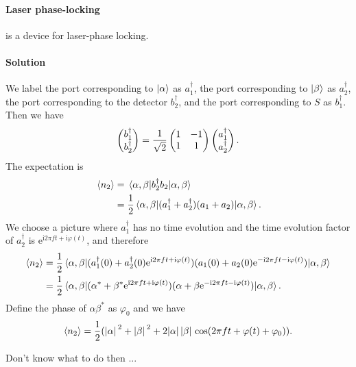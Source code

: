 \documentclass[hyperref, a4paper]{article}
\newcommand*{\ii}{\mathrm{i}}
\newcommand*{\ee}{\mathrm{e}}
\begin{document}
\paragraph{Laser phase-locking}  is a device for laser-phase locking. 


\paragraph{Solution} We label the port corresponding to $\ket{\alpha}$ as $a^\dagger_1$, the port corresponding to $\ket{\beta}$ as $a^\dagger_2$, the port corresponding to the detector $b^\dagger_2$, and the port corresponding to $S$ as $b^\dagger_1$.
Then we have 
\[
    \pmqty{b^\dagger_1 \\ b^\dagger_2} = \frac{1}{\sqrt{2}} \pmqty{1 & -1 \\ 1 & 1} \pmqty{ a^\dagger_1 \\ a^\dagger_2 }.
\]
The expectation is 
\[
    \begin{aligned}
        \expval*{n_2} &= \mel*{\alpha, \beta}{b_2^\dagger b_2}{\alpha, \beta} \\
        &= \frac{1}{2} \mel*{\alpha, \beta}{ (a_1^\dagger + a_2^\dagger) (a_1 + a_2) }{\alpha, \beta} .
    \end{aligned}
\]
We choose a picture where $a_1^\dagger$ has no time evolution and the time evolution factor of $a_2^\dagger$ is $\ee^{\ii 2 \pi f t + \ii \varphi(t)}$, and therefore
\[
    \begin{aligned}
        \expval{n_2} &= \frac{1}{2} \mel*{\alpha, \beta}{ (a_1^\dagger(0) + a_2^\dagger(0) \ee^{\ii 2 \pi f t + \ii \varphi(t)}) (a_1(0) + a_2(0) \ee^{- \ii 2 \pi f t - \ii \varphi(t)}) }{\alpha, \beta} \\
        &= \frac{1}{2} \mel*{\alpha, \beta}{ (\alpha^* + \beta^* \ee^{\ii 2 \pi f t + \ii \varphi(t)}) (\alpha + \beta \ee^{- \ii 2 \pi f t - \ii \varphi(t)}) }{\alpha, \beta} .
    \end{aligned}
\]
Define the phase of $\alpha \beta^*$ as $\varphi_0$ and we have 
\begin{equation}
    \expval{n_2} = \frac{1}{2} (\abs*{\alpha}^2 + \abs*{\beta}^2 + 2 \abs*{\alpha} \abs*{\beta} \cos(2 \pi f t + \varphi(t) + \varphi_0)).
\end{equation}

Don't know what to do then ...

\paragraph{}
\end{document}
